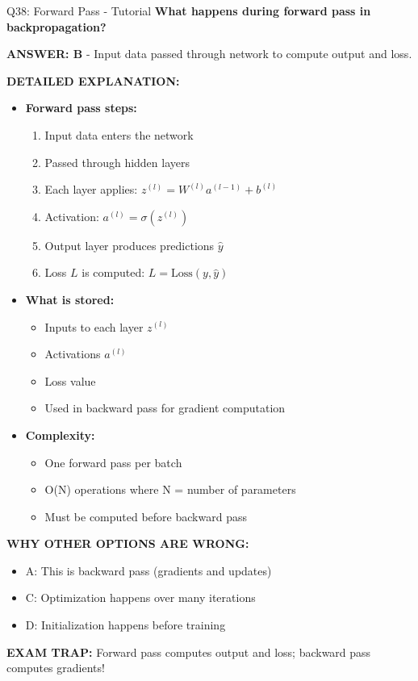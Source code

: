 \documentclass[8pt]{beamer}
\begin{document}
	\begin{frame}{Q38: Forward Pass - Tutorial}
		\fontsize{6.5}{7.5}\selectfont
		\textbf{What happens during forward pass in backpropagation?}
		
		\vspace{0.05cm}
		\textcolor{myblue}{\textbf{ANSWER: B}} - Input data passed through network to compute output and loss.
		
		\vspace{0.05cm}
		\textbf{DETAILED EXPLANATION:}
		\begin{itemize}
			\item \textbf{Forward pass steps:}
			\begin{enumerate}
				\item Input data enters the network
				\item Passed through hidden layers
				\item Each layer applies: $z^{(l)} = W^{(l)} a^{(l-1)} + b^{(l)}$
				\item Activation: $a^{(l)} = \sigma(z^{(l)})$
				\item Output layer produces predictions $\hat{y}$
				\item Loss $L$ is computed: $L = \text{Loss}(y, \hat{y})$
			\end{enumerate}
			\item \textbf{What is stored:}
			\begin{itemize}
				\item Inputs to each layer $z^{(l)}$
				\item Activations $a^{(l)}$
				\item Loss value
				\item Used in backward pass for gradient computation
			\end{itemize}
			\item \textbf{Complexity:}
			\begin{itemize}
				\item One forward pass per batch
				\item O(N) operations where N = number of parameters
				\item Must be computed before backward pass
			\end{itemize}
		\end{itemize}
		
		\vspace{0.05cm}
		\textcolor{myred}{\textbf{WHY OTHER OPTIONS ARE WRONG:}}
		\begin{itemize}
			\item \textcolor{myred}{A:} This is backward pass (gradients and updates)
			\item \textcolor{myred}{C:} Optimization happens over many iterations
			\item \textcolor{myred}{D:} Initialization happens before training
		\end{itemize}
		
		\textcolor{myred}{\textbf{EXAM TRAP:}} Forward pass computes \textcolor{myblue}{output and loss}; backward pass computes gradients!
	\end{frame}
	
\end{document}
